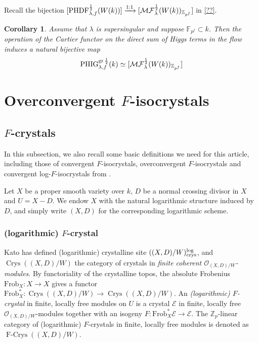 \documentclass[12pt,twoside]{book}
\theoremstyle{plain}
\newtheorem{corollary}[corollary]{Corollary}
\theoremstyle{definition}
\theoremstyle{remark}
\newcommand{\bF}{{\mathbb F}}
\newcommand{\bZ}{{\mathbb Z}}
\newcommand{\mE}{{\mathcal E}}
\newcommand{\MF}{\mathcal{MF}}
\DeclareMathOperator{\Crys}{Crys}
\DeclareMathOperator{\FCrys}{F-Crys}
\numberwithin{equation}{section}
\def\MFh{\MF^{{1\over 2}}_{\lambda}}
\def\PHDFhf{\mathrm{PHDF}^{{1\over 2}}_{\lambda,f}}
\def\PHighf{{\mathrm{PHIG}^{{\rm gr}\,{1\over 2}}_{\lambda,f}}}
\def\Frob{\mathrm{Frob}}
\begin{document}
Recall the bijection $[\PHDFhf(W(k))] \xrightarrow{1:1} [\MFh(W(k))_{\bZ_{p^f}}]$ in \eqref{??}.
\begin{corollary} Assume that $\lambda$ is supersingular and suppose $\bF_{p^f}\subset k$. Then the operation of the Cartier functor on the direct sum of Higgs terms in the flow induces a natural bijective map
\[\PHighf(k) \simeq [\MFh(W(k))_{\bZ_{p^f}}]\]
\end{corollary}



\newpage

\section{\bf Overconvergent $F$-isocrystals} \label{sec_main_F_Isoc}

\subsection{$F$-crystals}

In this subsection, we also recall some basic definitions we need for this article, including those of convergent $F$-isocrystals, overconvergent $F$-isocrystals and convergent log-$F$-isocrystals from \cite[Definition 2.1, Definition 2.4 and Definition 7.1]{Ked22}.

Let $X$ be a proper smooth variety over $k$, $D$ be a normal crossing divisor in $X$ and $U = X-D$. We endow $X$ with the natural logarithmic structure induced by $D$, and simply write $(X,D)$ for the corresponding logarithmic scheme.

\subsubsection{(logarithmic) $F$-crystal}
Kato has defined (logarithmic) crystalline site $((X,D)/W)^{\log}_{\rm crys}$, and $\Crys((X,D)/W)$ the category of crystals in \emph{finite coherent $\mathcal{O}_{(X,D)/W}$-modules}. By functoriality of the crystalline topos, the absolute Frobenius $\Frob_{X}:X\rightarrow X$ gives a functor $\Frob_{X}^{*}\colon\Crys((X,D)/W) \rightarrow \Crys((X,D)/W)$. An \emph{(logarithmic) $F$-crystal} in finite, locally free modules on $U$ is a crystal $\mE$ in finite, locally free $\mathcal{O}_{(X,D)/W}$-modules together with an isogeny $F\colon \Frob_{X}^{*}\mE\rightarrow \mE$. The $\mathbb{Z}_{p}$-linear category of (logarithmic) $F$-crystals in finite, locally free modules is denoted as $\FCrys((X,D)/W)$.
\end{document}
